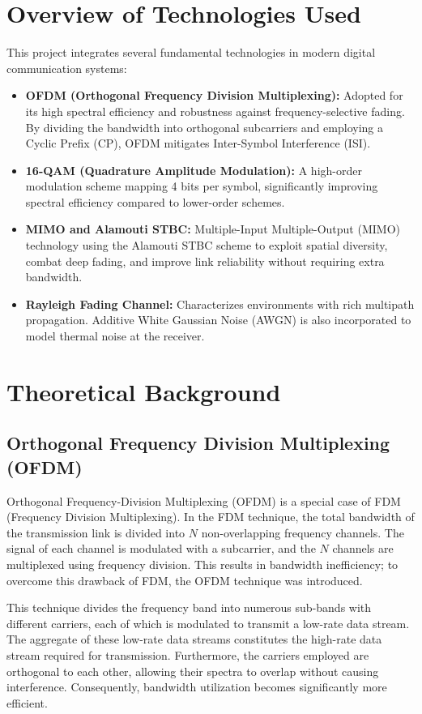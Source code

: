 \documentclass[a4paper]{article}
\begin{document}
\section{Overview of Technologies Used}
This project integrates several fundamental technologies in modern digital communication systems:
\begin{itemize}
    \item \textbf{OFDM (Orthogonal Frequency Division Multiplexing):} Adopted for its high spectral efficiency and robustness against frequency-selective fading. By dividing the bandwidth into orthogonal subcarriers and employing a Cyclic Prefix (CP), OFDM mitigates Inter-Symbol Interference (ISI).
    \item \textbf{16-QAM (Quadrature Amplitude Modulation):} A high-order modulation scheme mapping 4 bits per symbol, significantly improving spectral efficiency compared to lower-order schemes.
    \item \textbf{MIMO and Alamouti STBC:} Multiple-Input Multiple-Output (MIMO) technology using the Alamouti STBC scheme to exploit spatial diversity, combat deep fading, and improve link reliability without requiring extra bandwidth.
    \item \textbf{Rayleigh Fading Channel:} Characterizes environments with rich multipath propagation. Additive White Gaussian Noise (AWGN) is also incorporated to model thermal noise at the receiver.
\end{itemize}

\section{Theoretical Background}

\subsection{Orthogonal Frequency Division Multiplexing (OFDM)}
Orthogonal Frequency-Division Multiplexing (OFDM) is a special case of FDM (Frequency Division Multiplexing). In the FDM technique, the total bandwidth of the transmission link is divided into $N$ non-overlapping frequency channels. The signal of each channel is modulated with a subcarrier, and the $N$ channels are multiplexed using frequency division. This results in bandwidth inefficiency; to overcome this drawback of FDM, the OFDM technique was introduced.

This technique divides the frequency band into numerous sub-bands with different carriers, each of which is modulated to transmit a low-rate data stream. The aggregate of these low-rate data streams constitutes the high-rate data stream required for transmission. Furthermore, the carriers employed are orthogonal to each other, allowing their spectra to overlap without causing interference. Consequently, bandwidth utilization becomes significantly more efficient.
\end{document}
